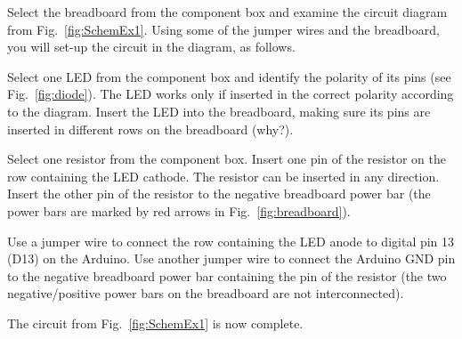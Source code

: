 \documentclass[12pt]{book}
\begin{document}
\begin{compactitem}[--]
  \item Select the breadboard from the component box and examine the
    circuit diagram from Fig.~\ref*{fig:SchemEx1}. Using some of the
    jumper wires and the breadboard, you will set-up the circuit in
    the diagram, as follows.
	\item Select one LED from the component box and identify
    the polarity of its pins (see
    Fig.~\ref*{fig:diode}). The LED works only if inserted in the
    correct polarity according to the diagram. Insert the LED into the
    breadboard, making sure its pins are inserted in different rows on
    the breadboard (why?).
	\item Select one resistor from the component box. Insert one pin of
    the resistor on the row containing the LED cathode. The resistor can
    be inserted in any direction. Insert the other pin of the resistor
    to the negative breadboard power bar (the power bars are marked by
    red arrows in Fig.~\ref*{fig:breadboard}).
  \item Use a jumper wire to connect the row containing the LED anode
    to digital pin 13 (D13) on the Arduino. Use another jumper wire to
    connect the Arduino GND pin to the negative breadboard power bar
    containing the pin of the resistor (the two negative/positive 
    power bars on the breadboard are not interconnected).
\item The circuit from Fig.~\ref*{fig:SchemEx1} is now complete.
\end{compactitem}
\end{document}
